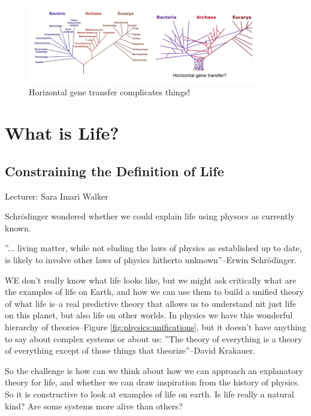 \documentclass[]{article}
\begin{document}
\begin{figure}[H]
	\caption{Horizontal gene transfer complicates things!}\label{fig:PhylogenyHorizontal} 
	\includegraphics[width=0.9\textwidth]{PhylogenyHorizontal}
\end{figure}



\section{What is Life?}

\subsection{Constraining the Definition of Life}

Lecturer:  Sara Imari Walker

Schrödinger wondered whether we could explain life using physocs as currently known.

''... living matter, while not eluding the laws of physics as established up to date, is likely to involve other laws of physics hitherto unknown''--Erwin Schrödinger\cite{schrodinger1944life}.

WE don't really know what life looks like, but we might ask critically what are the examples of life on Earth, and how we can use them to build a unified theory of what life is--a real predictive theory that allows us to understand nit just life on this planet, but also life on other worlds. In physics we have this wonderful hierarchy of theories--Figure \ref{fig:physics:unifications}, but it doesn't have anything to say about complex systems or about us: ''The theory of everything is a theory of everything except of those things that theorize''--David Krakauer.

So the challenge is how can we think about how we can approach an explanatory theory for life, and whether we can draw inspiration from the history of physics. So it is constructive to look at examples of life on earth. Is life really a natural kind? Are some systems more alive than others?
\end{document}
